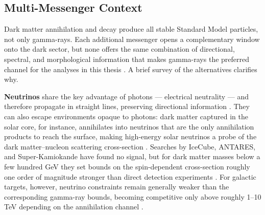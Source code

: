 \subsection{Multi-Messenger Context}
\label{sec:multi_messenger}

Dark matter annihilation and decay produce all stable Standard Model particles, not only gamma-rays.
Each additional messenger opens a complementary window onto the dark sector, but none offers the same combination of directional, spectral, and morphological information that makes gamma-rays the preferred channel for the analyses in this thesis \cite{Cirelli:2024ssz}.
A brief survey of the alternatives clarifies why.

\textbf{Neutrinos} share the key advantage of photons --- electrical neutrality --- and therefore propagate in straight lines, preserving directional information \cite{Cirelli:2024ssz,Hooper:2024}.
They can also escape environments opaque to photons: dark matter captured in the solar core, for instance, annihilates into neutrinos that are the only annihilation products to reach the surface, making high-energy solar neutrinos a probe of the dark matter--nucleon scattering cross-section \cite{Cirelli:2024ssz}.
Searches by IceCube, ANTARES, and Super-Kamiokande have found no signal, but for dark matter masses below a few hundred GeV they set bounds on the spin-dependent cross-section roughly one order of magnitude stronger than direct detection experiments \cite{IceCube:2016dgk,Cirelli:2024ssz}.
For galactic targets, however, neutrino constraints remain generally weaker than the corresponding gamma-ray bounds, becoming competitive only above roughly 1--10 TeV depending on the annihilation channel \cite{Cirelli:2024ssz}.

